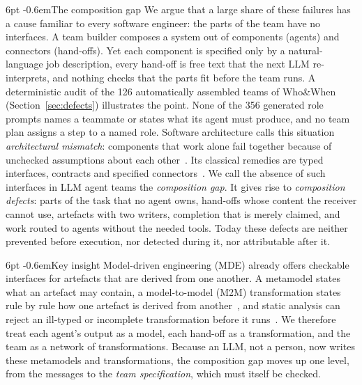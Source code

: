 \documentclass[pdflatex,sn-mathphys-num]{sn-jnl}
\makeatletter
\theoremstyle{thmstyleone}%
\theoremstyle{thmstyletwo}%
\theoremstyle{thmstylethree}%
\renewcommand\paragraph{\@startsection{paragraph}{4}{\z@}%
  {6pt \@plus 2pt \@minus 1pt}{-0.6em}{\normalfont\normalsize\bfseries}}
\makeatother
\begin{document}
\paragraph{The composition gap} We argue that a large share of these failures
has a cause familiar to every software engineer: the parts of the team have no
interfaces. A team builder composes a system out of components (agents) and
connectors (hand-offs). Yet each component is specified only by a
natural-language job description, every hand-off is free text that the next LLM
re-interprets, and nothing checks that the parts fit before the team runs. A
deterministic audit of the 126 automatically assembled teams of Who\&When
(Section~\ref{sec:defects}) illustrates the point. None of the 356 generated
role prompts names a teammate or states what its agent must produce, and no
team plan assigns a step to a named role. Software architecture calls this
situation \emph{architectural mismatch}: components that work alone fail
together because of unchecked assumptions about each
other~\cite{garlan1995mismatch,garlan2009mismatch}. Its classical remedies are
typed interfaces, contracts and specified
connectors~\cite{meyer1992dbc,allen1997connection}. We call the absence of such
interfaces in LLM agent teams the \emph{composition gap}. It gives rise to
\emph{composition defects}: parts of the task that no agent owns, hand-offs
whose content the receiver cannot use, artefacts with two writers, completion
that is merely claimed, and work routed to agents without the needed tools.
Today these defects are neither prevented before execution, nor detected during
it, nor attributable after it.

\paragraph{Key insight} Model-driven engineering (MDE) already offers checkable
interfaces for artefacts that are derived from one another. A metamodel states
what an artefact may contain, a model-to-model (M2M) transformation states rule
by rule how one artefact is derived from
another~\cite{czarnecki2006survey,mens2006taxonomy}, and static analysis can
reject an ill-typed or incomplete transformation before it
runs~\cite{cuadrado2017static}. We therefore treat each agent's output as a
model, each hand-off as a transformation, and the team as a network of
transformations. Because an LLM, not a person, now writes these metamodels and
transformations, the composition gap moves up one level, from the messages to
the \emph{team specification}, which must itself be checked.
\end{document}
